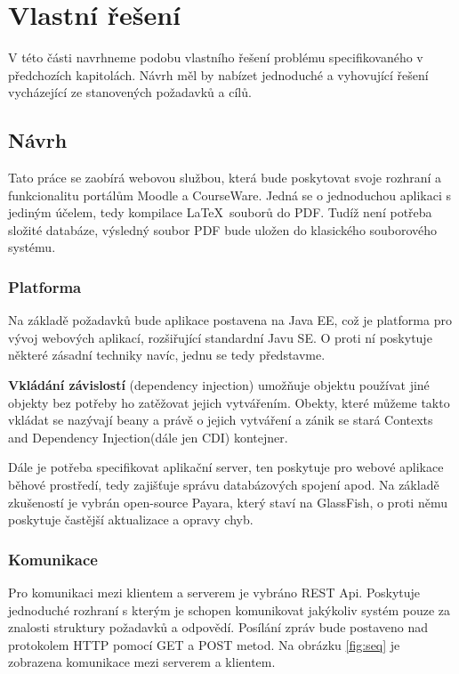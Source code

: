 \chapter{Vlastní řešení}  

V této části navrhneme podobu vlastního řešení problému specifikovaného v předchozích kapitolách. Návrh měl by nabízet jednoduché a vyhovující řešení vycházející ze stanovených požadavků a cílů. 

\section{Návrh}

Tato práce se zaobírá webovou službou, která bude poskytovat svoje rozhraní a funkcionalitu portálům Moodle a CourseWare. Jedná se o jednoduchou aplikaci s jediným účelem, tedy kompilace \LaTeX\ souborů do PDF. Tudíž není potřeba složité databáze, výsledný soubor PDF bude uložen do klasického souborového systému. 

\subsection{Platforma}
Na základě požadavků bude aplikace postavena na Java EE, což je platforma pro vývoj webových aplikací, rozšiřující standardní Javu SE. O proti ní poskytuje některé zásadní techniky navíc, jednu se tedy představme. 
\par
\textbf{Vkládání závislostí} (dependency injection) umožňuje objektu používat jiné objekty bez potřeby ho zatěžovat jejich vytvářením. Obekty, které můžeme takto vkládat se nazývají beany a právě o jejich vytváření a zánik se stará Contexts and Dependency Injection(dále jen CDI) kontejner.
\\[12pt]
\par
Dále je potřeba specifikovat aplikační server, ten poskytuje pro webové aplikace běhové prostředí, tedy zajišťuje správu databázových spojení apod. Na základě zkušeností je vybrán open-source Payara, který staví na GlassFish, o proti němu poskytuje častější aktualizace a opravy chyb. 

\subsection{Komunikace}
Pro komunikaci mezi klientem a serverem je vybráno REST Api. Poskytuje jednoduché rozhraní s kterým je schopen komunikovat jakýkoliv systém pouze za znalosti struktury požadavků a odpovědí. Posílání zpráv bude postaveno nad protokolem HTTP pomocí GET a POST metod. Na obrázku \ref{fig:seq} je zobrazena komunikace mezi serverem a klientem. 

